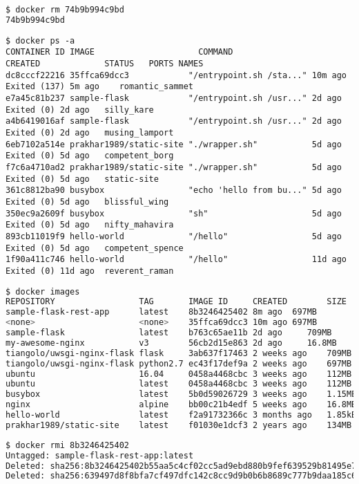 \begin{lstlisting}[language=bash]
$ docker rm 74b9b994c9bd
74b9b994c9bd
\end{lstlisting}

\begin{rotate}
\begin{lstlisting}[basicstyle=\tiny\ttfamily]
$ docker ps -a
CONTAINER ID IMAGE                     COMMAND                  CREATED             STATUS   PORTS NAMES
dc8cccf22216 35ffca69dcc3            "/entrypoint.sh /sta..." 10m ago Exited (137) 5m ago    romantic_sammet
e7a45c81b237 sample-flask            "/entrypoint.sh /usr..." 2d ago     Exited (0) 2d ago   silly_kare
a4b6419016af sample-flask            "/entrypoint.sh /usr..." 2d ago     Exited (0) 2d ago   musing_lamport
6eb7102a514e prakhar1989/static-site "./wrapper.sh"           5d ago     Exited (0) 5d ago   competent_borg
f7c6a4710ad2 prakhar1989/static-site "./wrapper.sh"           5d ago     Exited (0) 5d ago   static-site
361c8812ba90 busybox                 "echo 'hello from bu..." 5d ago     Exited (0) 5d ago   blissful_wing
350ec9a2609f busybox                 "sh"                     5d ago     Exited (0) 5d ago   nifty_mahavira
893cb11019f9 hello-world             "/hello"                 5d ago     Exited (0) 5d ago   competent_spence
1f90a411c746 hello-world             "/hello"                 11d ago    Exited (0) 11d ago  reverent_raman

\end{lstlisting}
\end{rotate}

\begin{lstlisting}[language=bash]
$ docker images
REPOSITORY                 TAG       IMAGE ID     CREATED        SIZE
sample-flask-rest-app      latest    8b3246425402 8m ago  697MB
<none>                     <none>    35ffca69dcc3 10m ago 697MB
sample-flask               latest    b763c65ae11b 2d ago     709MB
my-awesome-nginx           v3        56cb2d15e863 2d ago     16.8MB
tiangolo/uwsgi-nginx-flask flask     3ab637f17463 2 weeks ago    709MB
tiangolo/uwsgi-nginx-flask python2.7 ec43f17def9a 2 weeks ago    697MB
ubuntu                     16.04     0458a4468cbc 3 weeks ago    112MB
ubuntu                     latest    0458a4468cbc 3 weeks ago    112MB
busybox                    latest    5b0d59026729 3 weeks ago    1.15MB
nginx                      alpine    bb00c21b4edf 5 weeks ago    16.8MB
hello-world                latest    f2a91732366c 3 months ago   1.85kB
prakhar1989/static-site    latest    f01030e1dcf3 2 years ago    134MB
\end{lstlisting}

\begin{lstlisting}[basicstyle=\tiny\ttfamily,language=bash]
$ docker rmi 8b3246425402
Untagged: sample-flask-rest-app:latest
Deleted: sha256:8b3246425402b55aa5c4cf02cc5ad9ebd880b9fef639529b81495e778e3b3246
Deleted: sha256:639497d8f8bfa7cf497dfc142c8cc9d9b0b6b8689c777b9daa185c618b33d03c
\end{lstlisting}

